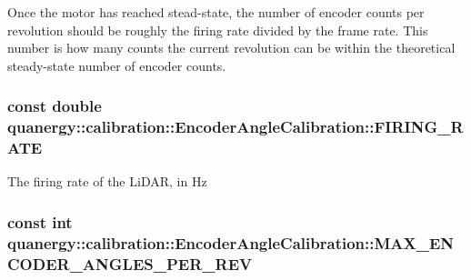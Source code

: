 Once the motor has reached stead-\/state, the number of encoder counts per revolution should be roughly the firing rate divided by the frame rate. This number is how many counts the current revolution can be within the theoretical steady-\/state number of encoder counts. \hypertarget{structquanergy_1_1calibration_1_1EncoderAngleCalibration_a76aedeeacc4ac54b5fa1324a144abaf6}{
\subsubsection[{F\-I\-R\-I\-N\-G\-\_\-\-R\-A\-T\-E}]{\setlength{\rightskip}{0pt plus 5cm}const double quanergy\-::calibration\-::\-Encoder\-Angle\-Calibration\-::\-F\-I\-R\-I\-N\-G\-\_\-\-R\-A\-T\-E\hspace{0.3cm}{\ttfamily [static]}}}\label{structquanergy_1_1calibration_1_1EncoderAngleCalibration_a76aedeeacc4ac54b5fa1324a144abaf6}
The firing rate of the Li\-D\-A\-R, in Hz \hypertarget{structquanergy_1_1calibration_1_1EncoderAngleCalibration_ab42e578d8a1c168e7d75506faad03dc2}{
\subsubsection[{M\-A\-X\-\_\-\-E\-N\-C\-O\-D\-E\-R\-\_\-\-A\-N\-G\-L\-E\-S\-\_\-\-P\-E\-R\-\_\-\-R\-E\-V}]{\setlength{\rightskip}{0pt plus 5cm}const int quanergy\-::calibration\-::\-Encoder\-Angle\-Calibration\-::\-M\-A\-X\-\_\-\-E\-N\-C\-O\-D\-E\-R\-\_\-\-A\-N\-G\-L\-E\-S\-\_\-\-P\-E\-R\-\_\-\-R\-E\-V\hspace{0.3cm}{\ttfamily [static]}}}\label{structquanergy_1_1calibration_1_1EncoderAngleCalibration_ab42e578d8a1c168e7d75506faad03dc2}
